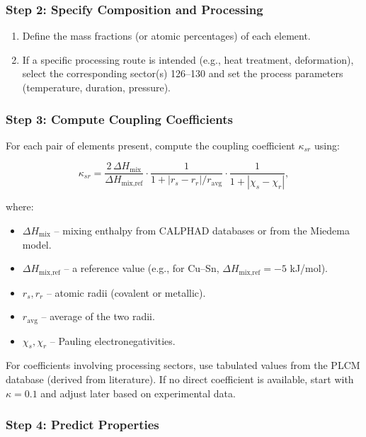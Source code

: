 \documentclass[12pt,a4paper]{article}
\begin{document}
	\subsubsection{Step 2: Specify Composition and Processing}
	
	\begin{enumerate}
		\item Define the mass fractions (or atomic percentages) of each element.
		\item If a specific processing route is intended (e.g., heat treatment, deformation), select the corresponding sector(s) 126–130 and set the process parameters (temperature, duration, pressure).
	\end{enumerate}
	
	\subsubsection{Step 3: Compute Coupling Coefficients}
	
	For each pair of elements present, compute the coupling coefficient \(\kappa_{sr}\) using:
	
	\[
	\kappa_{sr} = \frac{2\,\Delta H_{\text{mix}}}{\Delta H_{\text{mix,ref}}} \cdot
	\frac{1}{1 + |r_s - r_r|/r_{\text{avg}}} \cdot
	\frac{1}{1 + |\chi_s - \chi_r|},
	\]
	
	where:
	\begin{itemize}
		\item \(\Delta H_{\text{mix}}\) – mixing enthalpy from CALPHAD databases or from the Miedema model.
		\item \(\Delta H_{\text{mix,ref}}\) – a reference value (e.g., for Cu–Sn, \(\Delta H_{\text{mix,ref}} = -5\) kJ/mol).
		\item \(r_s, r_r\) – atomic radii (covalent or metallic).
		\item \(r_{\text{avg}}\) – average of the two radii.
		\item \(\chi_s, \chi_r\) – Pauling electronegativities.
	\end{itemize}
	
	For coefficients involving processing sectors, use tabulated values from the PLCM database (derived from literature). If no direct coefficient is available, start with \(\kappa = 0.1\) and adjust later based on experimental data.
	
	\subsubsection{Step 4: Predict Properties}
	
\end{document}
